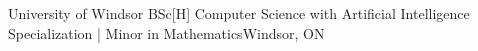 \resumeSubheading
{University of Windsor}{}
{BSc[H] Computer Science with Artificial Intelligence Specialization | Minor in Mathematics}{Windsor, ON}
\resumeItemListStart
\resumeItemListEnd